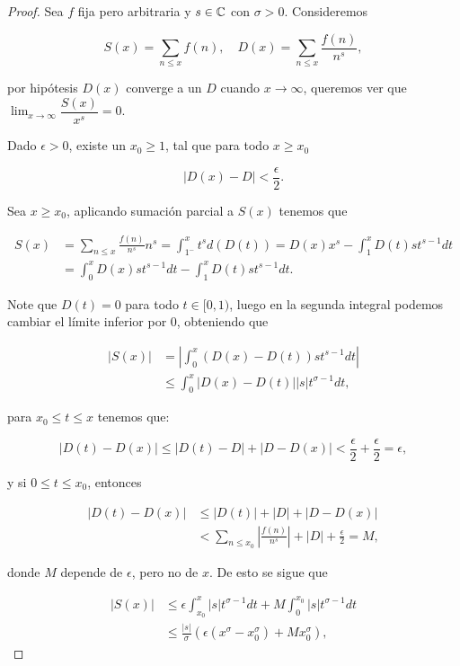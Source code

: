 \begin{proof}
Sea $f$ fija pero arbitraria y $s\in \mathbb{C}$ con $\sigma>0$. Consideremos

$$S(x)=\sum_{n\leq x}f(n), \quad D(x)=\sum_{n\leq x}\frac{f(n)}{n^s},$$

por hipótesis $D(x)$ converge a un $D$ cuando $x\to\infty$, queremos ver que $\lim_{x \to \infty} \dfrac{S(x)}{x^s}=0$.

Dado $\epsilon>0$, existe un $x_0\geq 1$, tal que para todo $x\geq x_0$

$$|D(x)-D|<\frac{\epsilon}{2}.$$

Sea $x\geq x_0$, aplicando sumación parcial a $S(x)$ tenemos que

\begin{align*}
S(x)&=\sum_{n\leq x}\frac{f(n)}{n^s}n^s=\int_{1^{-}}^xt^sd(D(t))=D(x)x^s-\int_1^xD(t)st^{s-1}dt\\
&=\int_0^xD(x)st^{s-1}dt-\int_1^xD(t)st^{s-1}dt.
\end{align*}

Note que $D(t)=0$ para todo $t\in [0,1)$, luego en la segunda integral podemos cambiar el límite inferior por 0, obteniendo que

\begin{align*}
|S(x)|&=\left|\int_0^x(D(x)-D(t))st^{s-1}dt\right|\\
&\leq \int_0^x \left|D(x)-D(t)\right|\left|s\right|t^{\sigma-1}dt,
\end{align*}

para $x_0\leq t\leq x$ tenemos que:

$$|D(t)-D(x)|\leq |D(t)-D|+|D-D(x)|<\frac{\epsilon}{2}+\frac{\epsilon}{2}=\epsilon,$$

y si $0\leq t\leq x_0$, entonces

\begin{align*}
|D(t)-D(x)|&\leq|D(t)|+|D|+|D-D(x)|\\
&<\sum_{n\leq x_0}\left|\frac{f(n)}{n^s}\right|+|D|+\frac{\epsilon}{2}=M , 
\end{align*}

donde $M$ depende de $\epsilon$, pero no de $x$. De esto se sigue que

$$
\begin{aligned}
|S(x)| & \leq \epsilon \int_{x_0}^x|s| t^{\sigma-1} d t+M \int_0^{x_0}|s| t^{\sigma-1}dt\\
& \leq \frac{|s|}{\sigma}\left(\epsilon\left(x^{\sigma}-x_0^{\sigma}\right)+M x_0^{\sigma}\right),
\end{aligned}
$$


\end{proof}
